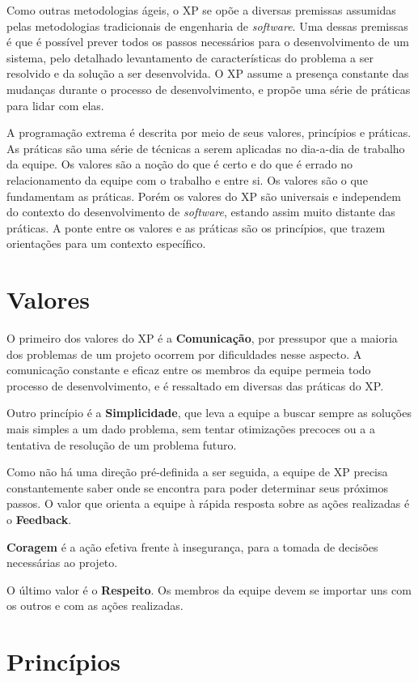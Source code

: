 \documentclass[a4paper,12pt,font=plain,header=plain]{abnt}
\begin{document}
	Como outras metodologias ágeis, o XP se opõe a diversas premissas assumidas pelas metodologias tradicionais de engenharia de \textit{software}. Uma dessas premissas é que é possível prever todos os passos necessários para o desenvolvimento de um sistema, pelo detalhado levantamento de características do problema a ser resolvido e da solução a ser desenvolvida. O XP assume a presença constante das mudanças durante o processo de desenvolvimento, e propõe uma série de práticas para lidar com elas.

	A programação extrema é descrita por meio de seus valores, princípios e práticas. As práticas são uma série de técnicas a serem aplicadas no dia-a-dia de trabalho da equipe. Os valores são a noção do que é certo e do que é errado no relacionamento da equipe com o trabalho e entre si. Os valores são o que fundamentam as práticas. Porém os valores do XP são universais e independem do contexto do desenvolvimento de \textit{software}, estando assim muito distante das práticas. A ponte entre os valores e as práticas são os princípios, que trazem orientações para um contexto específico.

	\section{Valores}

	O primeiro dos valores do XP é a \textbf{Comunicação}, por pressupor que a maioria dos problemas de um projeto ocorrem por dificuldades nesse aspecto. A comunicação constante e eficaz entre os membros da equipe permeia todo processo de desenvolvimento, e é ressaltado em diversas das práticas do XP.

	Outro princípio é a \textbf{Simplicidade}, que leva a equipe a buscar sempre as soluções mais simples a um dado problema, sem tentar otimizações precoces ou a a tentativa de resolução de um problema futuro.

	Como não há uma direção pré-definida a ser seguida, a equipe de XP precisa constantemente saber onde se encontra para poder determinar seus próximos passos. O valor que orienta a equipe à rápida resposta sobre as ações realizadas é o \textbf{Feedback}.

	\textbf{Coragem} é a ação efetiva frente à insegurança, para a tomada de decisões necessárias ao projeto.

	O último valor é o \textbf{Respeito}. Os membros da equipe devem se importar uns com os outros e com as ações realizadas.

	\section{Princípios}
\end{document}
